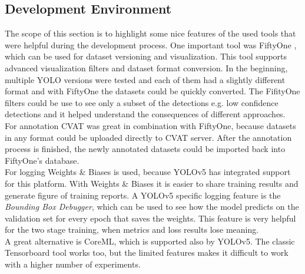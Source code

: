 \subsection{Development Environment}
The scope of this section is to highlight some nice features of the used tools that were helpful during the development process. One important tool was FiftyOne \cite{fiftyone_git}, which can be used for dataset versioning and visualization. This tool supports advanced visualization filters and dataset format conversion. In the beginning, multiple YOLO versions were tested and each of them had a slightly different format and with FiftyOne the datasets could be quickly converted. The FifityOne filters could be use to see only a subset of the detections e.g. low confidence detections and it helped understand the consequences of different approaches.  \\
For annotation CVAT was great in combination with FiftyOne, because datasets in any format could be uploaded directly to CVAT server. After the annotation process is finished, the newly annotated datasets could be imported back into FiftyOne's database. \\
For logging Weights \& Biases is used, because YOLOv5 has integrated support for this platform. With Weights \& Biases it is easier to share training results and generate figure of training reports. A YOLOv5 specific logging feature is the \textit{Bounding Box Debugger}, which can be used to see how the model predicts on the validation set for every epoch that saves the weights. This feature is very helpful for the two stage training, when metrics and loss results lose meaning. \\
A great alternative is CoreML, which is supported also by YOLOv5. The classic Tensorboard tool works too, but the limited features makes it difficult to work with a higher number of experiments. \\
